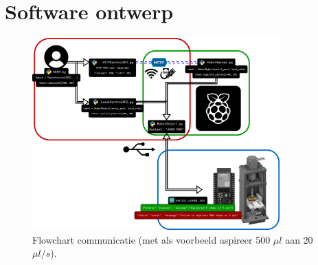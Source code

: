 \section{Software ontwerp}
\begin{figure}[H]
    \centering
    \includegraphics[width=0.85\textwidth]{figures/Flowchart.png}
    \caption{Flowchart communicatie (met als voorbeeld aspireer 500 $\mu l$ aan 20 $\mu l/s$).}\label{fig:Flowchart}
\end{figure}

